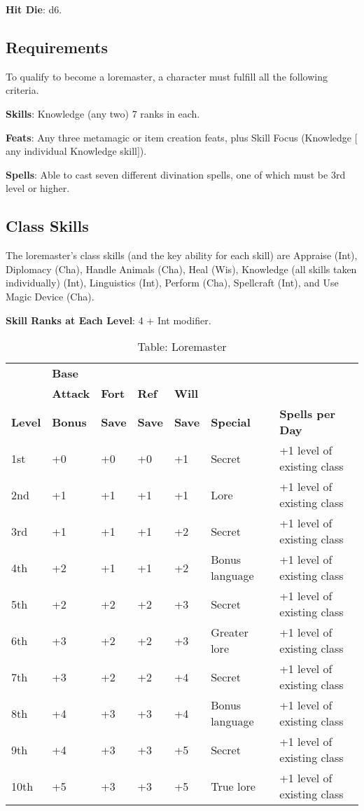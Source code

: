 \textbf{Hit Die}: d6.
				
\subsection{Requirements}

				
To qualify to become a loremaster, a character must fulfill all the following criteria.
				
\textbf{Skills}: Knowledge (any two) 7 ranks in each.
				
\textbf{Feats}: Any three metamagic or item creation feats, plus Skill Focus (Knowledge \mbox{$[$}any individual Knowledge skill\mbox{$]$}).
				
\textbf{Spells}: Able to cast seven different divination spells, one of which must be 3rd level or higher.
				
\subsection{Class Skills}

				
The loremaster's class skills (and the key ability for each skill) are Appraise (Int), Diplomacy (Cha), Handle Animals (Cha), Heal (Wis), Knowledge (all skills taken individually) (Int), Linguistics (Int), Perform (Cha), Spellcraft (Int), and Use Magic Device (Cha). 
				
\textbf{Skill Ranks at Each Level}: 4 + Int modifier.

\begin{table}[]
\sffamily
\caption{Table: Loremaster}
\begin{tabular}{lllllll}
      & \textbf{Base} & & & & & \\ 
      & \textbf{Attack} & \textbf{Fort} & \textbf{Ref} & \textbf{Will} & & \\
\textbf{Level} & \textbf{Bonus }& \textbf{Save }&\textbf{ Save }& \textbf{Save }& \textbf{Special }& \textbf{Spells per Day}\\
1st & +0 & +0 & +0 & +1 & Secret & +1 level of existing class\\
2nd & +1 & +1 & +1 & +1 & Lore & +1 level of existing class\\
3rd & +1 & +1 & +1 & +2 & Secret & +1 level of existing class\\
4th & +2 & +1 & +1 & +2 & Bonus language & +1 level of existing class\\
5th & +2 & +2 & +2 & +3 & Secret & +1 level of existing class\\
6th & +3 & +2 & +2 & +3 & Greater lore & +1 level of existing class\\
7th & +3 & +2 & +2 & +4 & Secret & +1 level of existing class\\
8th & +4 & +3 & +3 & +4 & Bonus language & +1 level of existing class\\
9th & +4 & +3 & +3 & +5 & Secret & +1 level of existing class\\
10th & +5 & +3 & +3 & +5 & True lore & +1 level of existing class\\
\end{tabular}
\end{table}
				
